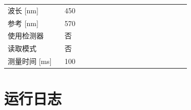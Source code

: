 \documentclass[UTF8,10pt,a4paper,fontset=fandol]{ctexart}
\newcommand{\fieldvalue}[1]{#1}
\begin{document}
\begin{tabular}{@{}p{0.28\linewidth}p{0.62\linewidth}@{}}
波长 [nm] &
\fieldvalue{450}\\
参考 [nm] &
\fieldvalue{570}\\
使用检测器 &
\fieldvalue{否}\\
读取模式 &
\fieldvalue{否}\\
测量时间 [ms] &
\fieldvalue{100}\\
\end{tabular}

\section*{运行日志}
\end{document}
